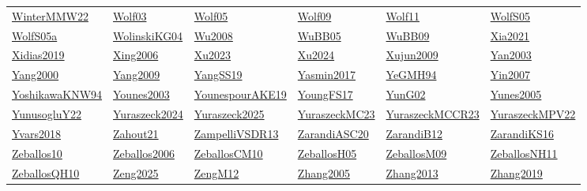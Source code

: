 \begin{longtable}{*{6}{l}}
\hyperref[detail:WinterMMW22]{WinterMMW22} & \hyperref[detail:Wolf03]{Wolf03} & \hyperref[detail:Wolf05]{Wolf05} & \hyperref[detail:Wolf09]{Wolf09} & \hyperref[detail:Wolf11]{Wolf11} & \hyperref[detail:WolfS05]{WolfS05}\\ 
\hyperref[detail:WolfS05a]{WolfS05a} & \hyperref[detail:WolinskiKG04]{WolinskiKG04} & \hyperref[detail:Wu2008]{Wu2008} & \hyperref[detail:WuBB05]{WuBB05} & \hyperref[detail:WuBB09]{WuBB09} & \hyperref[detail:Xia2021]{Xia2021}\\ 
\hyperref[detail:Xidias2019]{Xidias2019} & \hyperref[detail:Xing2006]{Xing2006} & \hyperref[detail:Xu2023]{Xu2023} & \hyperref[detail:Xu2024]{Xu2024} & \hyperref[detail:Xujun2009]{Xujun2009} & \hyperref[detail:Yan2003]{Yan2003}\\ 
\hyperref[detail:Yang2000]{Yang2000} & \hyperref[detail:Yang2009]{Yang2009} & \hyperref[detail:YangSS19]{YangSS19} & \hyperref[detail:Yasmin2017]{Yasmin2017} & \hyperref[detail:YeGMH94]{YeGMH94} & \hyperref[detail:Yin2007]{Yin2007}\\ 
\hyperref[detail:YoshikawaKNW94]{YoshikawaKNW94} & \hyperref[detail:Younes2003]{Younes2003} & \hyperref[detail:YounespourAKE19]{YounespourAKE19} & \hyperref[detail:YoungFS17]{YoungFS17} & \hyperref[detail:YunG02]{YunG02} & \hyperref[detail:Yunes2005]{Yunes2005}\\ 
\hyperref[detail:YunusogluY22]{YunusogluY22} & \hyperref[detail:Yuraszeck2024]{Yuraszeck2024} & \hyperref[detail:Yuraszeck2025]{Yuraszeck2025} & \hyperref[detail:YuraszeckMC23]{YuraszeckMC23} & \hyperref[detail:YuraszeckMCCR23]{YuraszeckMCCR23} & \hyperref[detail:YuraszeckMPV22]{YuraszeckMPV22}\\ 
\hyperref[detail:Yvars2018]{Yvars2018} & \hyperref[detail:Zahout21]{Zahout21} & \hyperref[detail:ZampelliVSDR13]{ZampelliVSDR13} & \hyperref[detail:ZarandiASC20]{ZarandiASC20} & \hyperref[detail:ZarandiB12]{ZarandiB12} & \hyperref[detail:ZarandiKS16]{ZarandiKS16}\\ 
\hyperref[detail:Zeballos10]{Zeballos10} & \hyperref[detail:Zeballos2006]{Zeballos2006} & \hyperref[detail:ZeballosCM10]{ZeballosCM10} & \hyperref[detail:ZeballosH05]{ZeballosH05} & \hyperref[detail:ZeballosM09]{ZeballosM09} & \hyperref[detail:ZeballosNH11]{ZeballosNH11}\\ 
\hyperref[detail:ZeballosQH10]{ZeballosQH10} & \hyperref[detail:Zeng2025]{Zeng2025} & \hyperref[detail:ZengM12]{ZengM12} & \hyperref[detail:Zhang2005]{Zhang2005} & \hyperref[detail:Zhang2013]{Zhang2013} & \hyperref[detail:Zhang2019]{Zhang2019}\\ 

\end{longtable}

